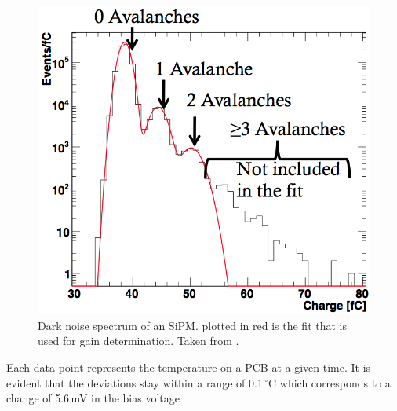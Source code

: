 \begin{figure}[h]
\begin{minipage}[t]{0.455\textwidth}
\includegraphics[width=\textwidth]{Figures/kuensken/gainDetermination.png}
\caption{Dark noise spectrum of an SiPM. plotted in red is the fit that is used for gain determination. Taken from \cite{kuenskenCalor}.}
\label{kuenskendarkNoise}
\end{minipage}
\end{figure}
Each data point represents the temperature on a PCB at a given time. It is evident that the deviations stay within a range of 0.1\,$^\circ$C which corresponds to a change of 5.6\,mV in the bias voltage

